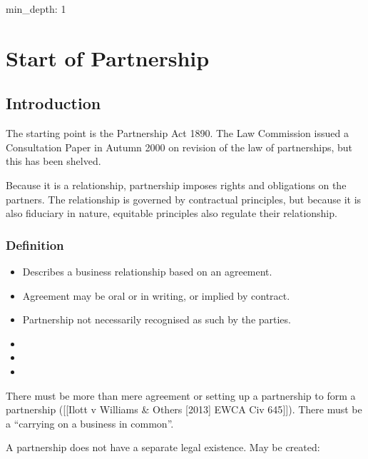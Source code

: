 \documentclass[
]{article}
\author{}
\date{}
\newenvironment{Shaded}{}{}
\newcommand{\NormalTok}[1]{#1}
\providecommand{\tightlist}{%
  \setlength{\itemsep}{0pt}\setlength{\parskip}{0pt}}
\begin{document}
{
\setcounter{tocdepth}{3}
\tableofcontents
}
\begin{Shaded}
\begin{Highlighting}[]
\NormalTok{min\_depth: 1}
\end{Highlighting}
\end{Shaded}

\hypertarget{start-of-partnership}{%
\section{Start of Partnership}\label{start-of-partnership}}

\hypertarget{introduction}{%
\subsection{Introduction}\label{introduction}}

The starting point is the Partnership Act 1890. The Law Commission
issued a Consultation Paper in Autumn 2000 on revision of the law of
partnerships, but this has been shelved.

Because it is a relationship, partnership imposes rights and obligations
on the partners. The relationship is governed by contractual principles,
but because it is also fiduciary in nature, equitable principles also
regulate their relationship.

\hypertarget{definition}{%
\subsubsection{Definition}\label{definition}}

\begin{itemize}
\tightlist
\item
  Describes a business relationship based on an agreement.
\item
  Agreement may be oral or in writing, or implied by contract.
\item
  Partnership not necessarily recognised as such by the parties.
\item
\item
\item
\end{itemize}

There must be more than mere agreement or setting up a partnership to
form a partnership ({[}{[}Ilott v Williams \& Others {[}2013{]} EWCA Civ
645{]}{]}). There must be a ``carrying on a business in common''.

A partnership does not have a separate legal existence. May be created:
\end{document}
